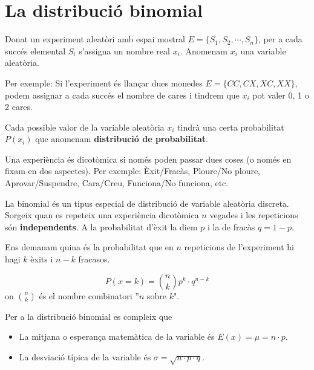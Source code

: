  
\section{La distribució binomial}

\begin{theorybox}
	Donat un experiment aleatòri amb espai mostral $E=\{S_1, S_2, \cdots, S_n\}$, per a cada succés elemental $S_i$ s'assigna un nombre real $x_i$. Anomenam $x_i$ una variable aleatòria.
	
	Per exemple: Si l'experiment és llançar dues monedes $E=\{CC, CX, XC, XX\}$, podem assignar a cada succés el nombre de cares i tindrem que $x_i$ pot valer 0, 1 o 2 cares.
	
	Cada possible valor de la variable aleatòria $x_i$ tindrà una certa probabilitat $P(x_i)$ que anomenam \textbf{distribució de probabilitat}. 
\end{theorybox}

\begin{theorybox}
	Una experiència és dicotòmica si només poden passar dues coses (o només en fixam en dos aspectes). Per exemple: Èxit/Fracàs, Ploure/No ploure, Aprovar/Suspendre, Cara/Creu, Funciona/No funciona, etc.
\end{theorybox}

\begin{theorybox}
	La binomial és un tipus especial de distribució de variable aleatòria discreta. Sorgeix quan es repeteix una experiència dicotòmica $n$ vegades i les repeticions són \textbf{independents}. A la probabilitat d'èxit la diem $p$ i la de fracàs $q=1-p$.
	 
	Ens demanam quina és la probabilitat que en $n$ repeticions de l'experiment hi hagi $k$ èxits i $n-k$ fracasos.
	
	\begin{equation}
	 P(x=k)=\binom{n}{k} p^k \cdot q^{n-k}
	\end{equation}
	on $\binom{n}{k}$ és el nombre combinatori ''$n$ sobre $k$".
	
	Per a la distribució binomial es compleix que
	\begin{itemize}
		\item 	La mitjana o esperança matemàtica de la variable és $E(x)=\mu = n \cdot p$.
		\item  La desviació típica de la variable és $\sigma = \sqrt{n \cdot p \cdot q}$. 
	\end{itemize}
	
\end{theorybox}

